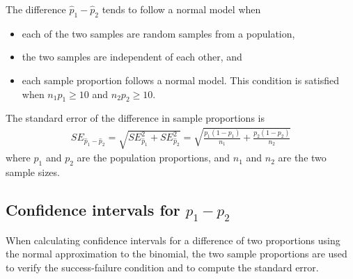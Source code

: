 \begin{termBox}{
The difference $\hat{p}_1 - \hat{p}_2$ tends to follow a normal model when
\begin{itemize}
\setlength{\itemsep}{0mm}
\item each of the two samples are random samples from a population,
\item the two samples are independent of each other, and
\item each sample proportion follows a normal model. This condition is satisfied when $n_1p_1 \geq 10$ and $n_2p_2 \geq 10$.
\end{itemize}
The standard error of the difference in sample proportions is
\begin{eqnarray}
SE_{\hat{p}_1 - \hat{p}_2}
	= \sqrt{SE_{\hat{p}_1}^2 + SE_{\hat{p}_2}^2}
	= \sqrt{\frac{p_1(1-p_1)}{n_1} + \frac{p_2(1-p_2)}{n_2}}
\label{seForDiffOfProp}
\end{eqnarray}
where $p_1$ and $p_2$ are the population proportions, and $n_1$ and $n_2$ are the two sample sizes.}
\end{termBox}


\subsection{Confidence intervals for $p_1 - p_2$}

When calculating confidence intervals for a difference of two proportions using the normal approximation to the binomial, the two sample proportions are used to verify the success-failure condition and to compute the standard error.

